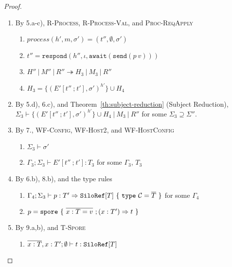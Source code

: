 \begin{proof}
\begin{enumerate}
\begin{enumerate}[label=(\alph*)]
  \item $M'' = \{h' \leftarrow m\} \uplus M_3$
  \item $\sigma'(id(l)) = v$
  \item $\Sigma'' \vdash H''~|~M''~|~R''$
  \end{enumerate}
  {\em Case 2:} $\sigma'(id(l)) = v$. In this case $H'' = H_p$, $M'' =
  M_p$, and $R'' = R_p$.
\item By 5.a-c), \textsc{R-Process}, \textsc{R-Process-Val}, and
  \textsc{Proc-ReqApply}
  \begin{enumerate}[label=(\alph*)]
  \item $\mathit{process}(h', m, \sigma') = (t'', \emptyset, \sigma')$
  \item $t'' = \texttt{respond}(h'', \iota, \texttt{await}(\texttt{send}(p~v)))$
  \item $H''~|~M''~|~R'' \twoheadrightarrow H_3~|~M_3~|~R''$
  \item $H_3 = \{ (E'[t''~\texttt{;}~t'], \sigma')^{h'} \} \cup H_4$
  \end{enumerate}
\item By 5.d), 6.c), and Theorem~\ref{th:subject-reduction} (Subject
  Reduction), $\Sigma_3 \vdash \{ (E'[t''~\texttt{;}~t'],
  \sigma')^{h'} \} \cup H_4~|~M_3~|~R''$ for some $\Sigma_3 \supseteq
  \Sigma''$.
\item By 7., \textsc{WF-Config}, \textsc{WF-Host2}, and \textsc{WF-HostConfig}
  \begin{enumerate}[label=(\alph*)]
  \item $\Sigma_3 \vdash \sigma'$
  \item $\Gamma_3 ; \Sigma_3 \vdash E'[t''~\texttt{;}~t'] : T_3$ for
    some $\Gamma_3$, $T_3$
  \end{enumerate}
\item By 6.b), 8.b), and the type rules
  \begin{enumerate}[label=(\alph*)]
  \item $\Gamma_4 ; \Sigma_3 \vdash p : T' \Rightarrow \texttt{SiloRef}[T]~\{~\texttt{type}~\mathcal{C} = \overline{T}~\}$ for some $\Gamma_4$
  \item $p = \texttt{spore}~\{~\overline{x : T = v}~; (x: T') \Rightarrow t~\}$
  \end{enumerate}
\item By 9.a,b), and \textsc{T-Spore}
  \begin{enumerate}[label=(\alph*)]
  \item $\overline{x : T}, x : T' ; \emptyset \vdash t : \texttt{SiloRef}[T]$

\end{enumerate}
\end{enumerate}
\end{proof}

